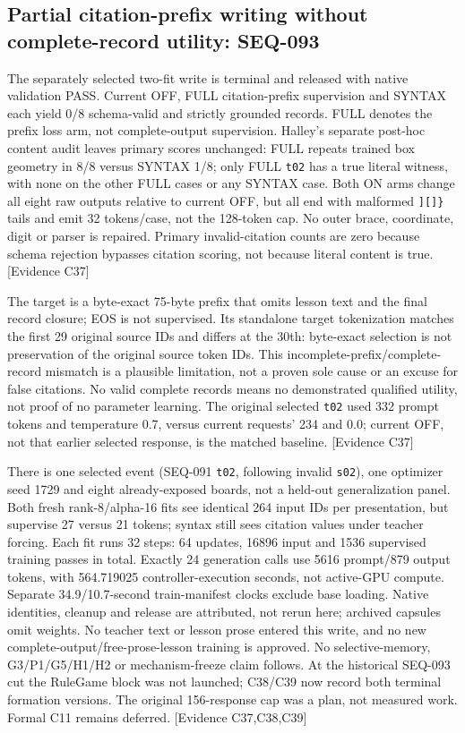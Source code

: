 \documentclass[11pt]{article}
\newcommand{\ev}[1]{\textsf{[Evidence #1]}}
\begin{document}
\subsection{Partial citation-prefix writing without complete-record utility: SEQ-093}
The separately selected two-fit write is terminal and released with native
validation PASS. Current OFF, FULL citation-prefix supervision and SYNTAX each
yield 0/8 schema-valid and strictly grounded records. FULL denotes the prefix
loss arm, not complete-output supervision. Halley's separate post-hoc content
audit leaves primary scores unchanged: FULL repeats trained box geometry in
8/8 versus SYNTAX 1/8; only FULL \texttt{t02} has a true literal witness, with
none on the other FULL cases or any SYNTAX case. Both ON arms change all eight
raw outputs relative to current OFF, but all end with malformed
\texttt{][]\}} tails and emit 32 tokens/case, not the 128-token cap. No outer
brace, coordinate, digit or parser is repaired. Primary invalid-citation
counts are zero because schema rejection bypasses citation scoring, not
because literal content is true. \ev{C37}

The target is a byte-exact 75-byte prefix that omits lesson text and the final
record closure; EOS is not supervised. Its standalone target tokenization
matches the first 29 original source IDs and differs at the 30th: byte-exact
selection is not preservation of the original source token IDs. This
incomplete-prefix/complete-record mismatch is a plausible limitation, not a
proven sole cause or an excuse for false citations. No valid complete records
means no demonstrated qualified utility, not proof of no parameter learning.
The original selected \texttt{t02} used 332 prompt tokens and temperature 0.7,
versus current requests' 234 and 0.0; current OFF, not that earlier selected
response, is the matched baseline. \ev{C37}

There is one selected event (SEQ-091 \texttt{t02}, following invalid
\texttt{s02}), one optimizer seed 1729 and eight already-exposed boards, not a
held-out generalization panel. Both fresh rank-8/alpha-16 fits see identical
264 input IDs per presentation, but supervise 27 versus 21 tokens; syntax
still sees citation values under teacher forcing. Each fit runs 32 steps:
64 updates, 16896 input and 1536 supervised training passes in total. Exactly
24 generation calls use 5616 prompt/879 output tokens, with
564.719025 controller-execution seconds, not active-GPU compute. Separate
34.9/10.7-second train-manifest clocks exclude base loading. Native identities,
cleanup and release are attributed, not rerun here; archived capsules omit
weights. No teacher text or lesson prose entered this write, and no new
complete-output/free-prose-lesson training is approved. No selective-memory,
G3/P1/G5/H1/H2 or mechanism-freeze claim follows. At the historical SEQ-093 cut the RuleGame block was not launched; C38/C39
now record both terminal formation versions. The original 156-response cap
was a plan, not measured work. Formal C11 remains deferred. \ev{C37,C38,C39}
\end{document}
